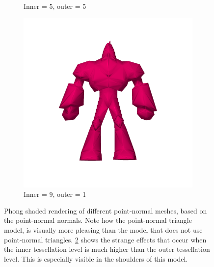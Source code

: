 \documentclass[a4paper,10pt]{article}
\begin{document}
\begin{figure}
\begin{subfigure}{\textwidth}
		\caption{Inner = 5, outer = 5}
		\label{fig:phong:i5o5}
	\end{subfigure}
	\begin{subfigure}{\textwidth}
		\centering
		\includegraphics[width=\textwidth, height=0.26\textheight, keepaspectratio=true]{enforcer_phong_phong_pn_i9_o1.png}
		\caption{Inner = 9, outer = 1}
		\label{fig:phong:i9o1}
	\end{subfigure}	
	\caption{Phong shaded rendering of different point-normal meshes, based on the point-normal normals. Note how  the point-normal triangle model, is visually more pleasing than  the model that does not use point-normal triangles. \ref{fig:phong:i9o1} shows the strange effects that occur when the inner tessellation level is much higher than the outer tessellation level. This is especially visible in the shoulders of this model.}
	\label{fig:phong}
\end{figure}
\end{document}

